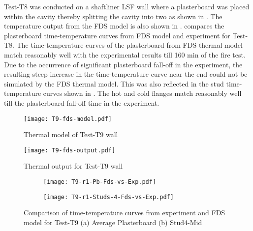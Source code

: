 Test-T8 was conducted on a shaftliner LSF wall where a plasterboard was placed within the cavity thereby splitting the cavity into two as shown in . The temperature output from the FDS model is also shown in .  compares the plasterboard time-temperature curves from FDS model and experiment for Test-T8. The time-temperature curves of the plasterboard from FDS thermal model match reasonably well with the experimental results till 160 min of the fire test. Due to the occurrence of significant plasterboard fall-off in the experiment, the resulting steep increase in the time-temperature curve near the end could not be simulated by the FDS thermal model. This was also reflected in the stud time-temperature curves shown in . The hot and cold flanges match reasonably well till the plasterboard fall-off time in the experiment.
\begin{figure}[!htbp]
	\centering
		\texttt{[image: T9-fds-model.pdf]}
		\caption{Thermal model of Test-T9 wall}
		\label{fig:T9-fds-model}
\end{figure}
\begin{figure}[!htbp]
	\centering
		\texttt{[image: T9-fds-output.pdf]}
		\caption{Thermal output for Test-T9 wall}
		\label{fig:T9-fds-model-output}
\end{figure}
\begin{figure}[!htbp]
	\centering
	\begin{subfigure}[b]{0.7\textwidth}
		\centering
		\texttt{[image: T9-r1-Pb-Fds-vs-Exp.pdf]}
		\caption{}
		\label{subfig:T9-r1-Pb-Fds-vs-Exp}
	\end{subfigure}
	\begin{subfigure}[b]{0.6\textwidth}
		\centering
		\texttt{[image: T9-r1-Studs-4-Fds-vs-Exp.pdf]}
		\caption{}
		\label{subfig:T9-r1-Studs-4-Fds-vs-Exp}
	\end{subfigure}
	   \caption{Comparison of time-temperature curves from experiment and FDS model for Test-T9 (a) Average Plasterboard (b) Stud4-Mid}
	   \label{fig:fds-output-pb-studs-t9}
\end{figure}

